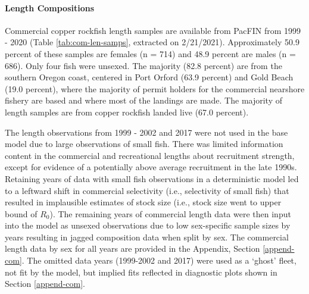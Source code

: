 \documentclass[11pt,
  english,
  a4paper,
]{article}
\begin{document}
\leavevmode\tagmcend\tagstructend\par


\hypertarget{commercial-fishery-length-and-age-data}{%
\paragraph{Length Compositions}\label{commercial-fishery-length-and-age-data}}

\leavevmode\tagmcend\tagstructend


Commercial copper rockfish length samples are available from PacFIN from 1999 - 2020 (Table \ref{tab:com-len-samps}, extracted on 2/21/2021). Approximately 50.9 percent of these samples are females (n = 714) and 48.9 percent are males (n = 686). Only four fish were unsexed. The majority (82.8 percent) are from the southern Oregon coast, centered in Port Orford (63.9 percent) and Gold Beach (19.0 percent), where the majority of permit holders for the commercial nearshore fishery are based and where most of the landings are made. The majority of length samples are from copper rockfish landed live (67.0 percent).

\leavevmode\tagmcend\tagstructend\par


The length observations from 1999 - 2002 and 2017 were not used in the base model due to large observations of small fish. There was limited information content in the commercial and recreational lengths about recruitment strength, except for evidence of a potentially above average recruitment in the late 1990s. Retaining years of data with small fish observations in a deterministic model led to a leftward shift in commercial selectivity (i.e., selectivity of small fish) that resulted in implausible estimates of stock size (i.e., stock size went to upper bound of {\(R_0\)\leavevmode\tagmcend\tagstructend}). The remaining years of commercial length data were then input into the model as unsexed observations due to low sex-specific sample sizes by years resulting in jagged composition data when split by sex. The commercial length data by sex for all years are provided in the Appendix, Section \ref{append-com}. The omitted data years (1999-2002 and 2017) were used as a `ghost' fleet, not fit by the model, but implied fits reflected in diagnostic plots shown in Section \ref{append-com}.
\end{document}
